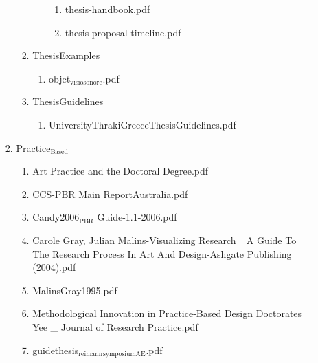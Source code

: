 \documentclass[11pt]{article}
\begin{document}
\begin{enumerate}
\begin{enumerate}
\begin{enumerate}
\begin{enumerate}
\begin{enumerate}
\begin{enumerate}
\item thesis-handbook.pdf
\label{sec-1-1-1-1-8-8-13-9-4-9-2}

\item thesis-proposal-timeline.pdf
\label{sec-1-1-1-1-8-8-13-9-4-9-3}
\end{enumerate}
\end{enumerate}

\item ThesisExamples
\label{sec-1-1-1-1-8-8-13-9-5}
\begin{enumerate}
\item objet$_{\text{visiosonore}}$.pdf
\label{sec-1-1-1-1-8-8-13-9-5-1}
\end{enumerate}

\item ThesisGuidelines
\label{sec-1-1-1-1-8-8-13-9-6}
\begin{enumerate}
\item UniversityThrakiGreeceThesisGuidelines.pdf
\label{sec-1-1-1-1-8-8-13-9-6-1}
\end{enumerate}
\end{enumerate}

\item Practice$_{\text{Based}}$
\label{sec-1-1-1-1-8-8-13-10}
\begin{enumerate}
\item Art Practice and the Doctoral Degree.pdf
\label{sec-1-1-1-1-8-8-13-10-1}

\item CCS-PBR Main ReportAustralia.pdf
\label{sec-1-1-1-1-8-8-13-10-2}

\item Candy2006$_{\text{PBR}}$ Guide-1.1-2006.pdf
\label{sec-1-1-1-1-8-8-13-10-3}

\item Carole Gray, Julian Malins-Visualizing Research\_ A Guide To The Research Process In Art And Design-Ashgate Publishing (2004).pdf
\label{sec-1-1-1-1-8-8-13-10-4}

\item MalinsGray1995.pdf
\label{sec-1-1-1-1-8-8-13-10-5}

\item Methodological Innovation in Practice-Based Design Doctorates \_ Yee \_ Journal of Research Practice.pdf
\label{sec-1-1-1-1-8-8-13-10-6}

\item guidethesis$_{\text{reimann}}$$_{\text{symposiumAE}}$.pdf
\label{sec-1-1-1-1-8-8-13-10-7}
\end{enumerate}


\end{enumerate}
\end{enumerate}
\end{enumerate}
\end{document}

